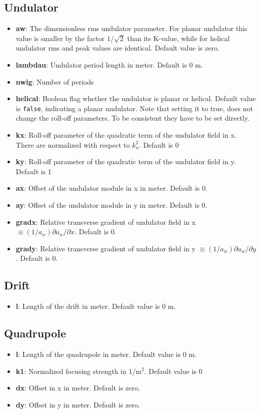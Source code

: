 \documentclass[12pt]{book}
\begin{document}
\subsection{\sf Undulator}
\begin{itemize}
\item {\bf aw}: The dimensionless rms undulator parameter. For planar undulator this value is smaller by the factor $1/\sqrt{2}$ than its K-value, while for helical undulator rms and peak values are identical. Default value is zero.
\item {\bf lambdau}: Undulator period length in meter. Default is 0 m.
\item {\bf nwig}: Number of periods
\item {\bf helical}: Boolean flag whether the undulator is planar or helical. Default value is {\tt false}, indicating a planar undulator. Note that setting it to true, does not change the roll-off parameters. To be consistent they have to be set directly.
\item {\bf kx}: Roll-off parameter of the quadratic term of the undulator field in x. There are normalized with respect to $k_u^2$. Default is 0
\item {\bf ky}: Roll-off parameter of the quadratic term of the undulator field in y. Default is 1
\item {\bf ax}: Offset of the undulator module in x in meter. Default is 0.
\item {\bf ay}: Offset of the undulator module in y in meter. Default is 0.
\item {\bf gradx}: Relative transverse gradient of undulator field in x $\equiv (1/a_w) \partial a_w/\partial x$. Default is 0.
\item {\bf grady}: Relative transverse gradient of undulator field in y $\equiv (1/a_w) \partial a_w/\partial y$. Default is 0.

\end{itemize}

\subsection {\sf Drift}
\begin{itemize}
\item {\bf l}: Length of the drift in meter. Default value is 0 m.
\end{itemize}

\subsection {\sf Quadrupole}
\begin{itemize}
\item {\bf l}: Length of the quadrupole in meter. Default value is 0 m.
\item {\bf k1}: Normalized focusing strength in 1/m$^2$. Default  value is 0
\item {\bf dx}: Offset in x in meter. Default is zero.
\item {\bf dy}: Offset in y in meter. Default is zero.
\end{itemize}
\end{document}
